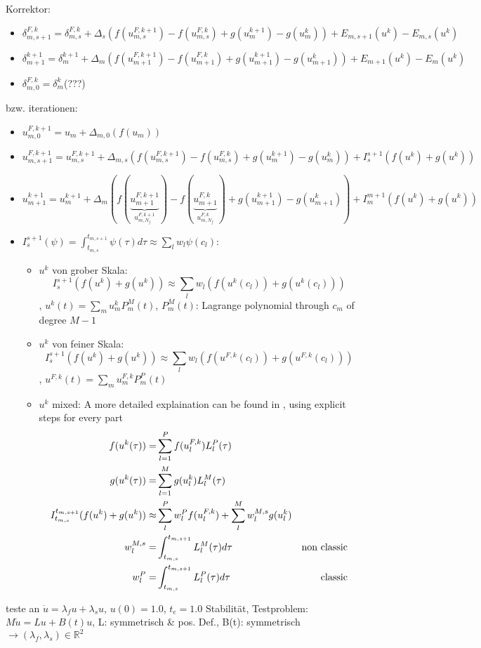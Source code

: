 \documentclass{article}
\begin{document}
 Korrektor:
 \begin{itemize}
  \item $\delta_{m,s+1}^{F,k}=\delta^{F,k}_{m,s}+\Delta_{s}(f(u_{m,s}^{F,k+1})-f(u_{m,s}^{F,k})+g(u_{m}^{k+1})-g(u_m^k))+E_{m,s+1}(u^k)-E_{m,s}(u^k)$
  \item $\delta_{m+1}^{k+1}=\delta_{m}^{k+1}+\Delta_m (f(u_{m+1}^{F,k+1})-f(u_{m+1}^{F,k})+g(u_{m+1}^{k+1})-g(u_{m+1}^k))+E_{m+1}(u^k)-E_{m}(u^k)$
  \item $\delta_{m,0}^{F,k}=\delta_{m}^k$(???)
 \end{itemize}
 bzw. iterationen:
  \begin{itemize}
   \item $u_{m,0}^{F,k+1}=u_{m}+\Delta_{m,0} (f(u_m))$
   \item $u_{m,s+1}^{F,k+1}=u_{m,s}^{F,k+1}+\Delta_{m,s}(f(u_{m,s}^{F,k+1})-f(u_{m,s}^{F,k})+g(u_{m}^{k+1})-g(u_m^k))+I_{s}^{s+1}(f(u^k)+g(u^k))$
   \item $u_{m+1}^{k+1}=u_{m}^{k+1}+\Delta_{m} (f(\underbrace{u^{F,k+1}_{m+1}}_{u^{F,k+1}_{m,N_f}})-f(\underbrace{u^{F,k}_{m+1}}_{u^{F,k}_{m,N_f}})+g(u_{m+1}^{k+1})-g(u_{m+1}^k))+I_{m}^{m+1}(f(u^k)+g(u^k))$
   \item $I_s^{s+1}(\psi)=\int_{t_{m,s}}^{t_{m,s+1}} \psi(\tau) d\tau\approx \sum_l w_l \psi(c_l)$:
    \begin{itemize}
     \item $u^k$ von grober Skala: $$I_{s}^{s+1}(f(u^k)+g(u^k))\approx \sum_l w_l( f(u^k(c_l))+g(u^k(c_l)))$$, $u^k(t)=\sum_m u^k_m P_m^M(t)$, $P_m^M(t)$: Lagrange polynomial through $c_m$ of degree $M-1$
     \item $u^k$ von feiner Skala: $$I_s^{s+1} (f(u^k)+g(u^k))\approx \sum_l w_l (f(u^{F,k}(c_l))+g(u^{F,k}(c_l)))$$, $u^{F,k}(t)=\sum_m u^{F,k}_m P_m^P(t)$
     \item $u^k$ mixed: A more detailed explaination can be found in \cite{bouzarth2010multirate}, using explicit steps for every part
      \begin{align*}
        f(u^k(\tau))=& \sum_{l=1}^P f(u^{F,k}_{l}) L_l^P(\tau) \cr
         g(u^k(\tau))=&\sum_{l=1}^M g(u^{k}_l) L_l^M(\tau) \cr
 	I_{t_{m,s}}^{t_{m,s+1}}(f(u^k)+g(u^k))\approx & \sum_l^P w_l^P f(u^{F,k}_l) + \sum_{l}^M w_l^{M,s} g(u^k_l) \cr
 	w_l^{M,s}=&\int_{t_{m,s}}^{t_{m,s+1}} L_l^{M}(\tau) d\tau &\text{non classic}\cr
 	w_l^{P}=&\int_{t_{m,s}}^{t_{m,s+1}} L_l^P(\tau) d\tau & \text{classic}
      \end{align*}
    \end{itemize}
  \end{itemize}
  teste an $\dot u=\lambda_fu + \lambda_s u$, $u(0)=1.0$, $t_e=1.0$
 Stabilität, Testproblem: $M\dot u = Lu+B(t)u$, L: symmetrisch \& pos. Def., B(t): symmetrisch $\rightarrow (\lambda_f, \lambda_s)\in \mathbb{R}^2$
 
\end{document}
